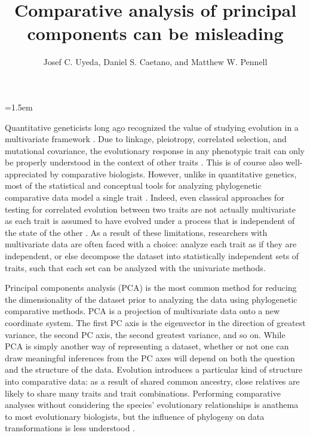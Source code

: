 \documentclass[a4paper,11pt]{article}
\title{Comparative analysis of principal components can be misleading}
\author{
Josef C. Uyeda, Daniel S. Caetano, and Matthew W. Pennell
}
\date{}
\affiliation{
Department of Biological Sciences \& Institute for Bioinformatics and Evolutionary Studies, University of Idaho, Moscow, ID 83844, U.S.A. 
}
\begin{document}
\mstitlepage
\parindent=1.5em
\addtolength{\parskip}{.3em}
\vfill
 
\finaltrue
\newpage
\singlespacing

\noindent Quantitative geneticists long ago recognized the value of studying evolution in a multivariate framework \citep{Pearson1903}. Due to linkage, pleiotropy, correlated selection, and mutational covariance, the evolutionary response in any phenotypic trait can only be properly understood in the context of other traits \citep{Lande1979, LynchWalsh}. This is of course also well-appreciated by comparative biologists. However, unlike in quantitative genetics, most of the statistical and conceptual tools for analyzing phylogenetic comparative data \citep[reviewed in][]{PennellHarmon} model a single trait \citep[but see,][for exceptions]{RevellHarmon2008, RevellPCCA, Hohenlohe2008, RevellCollar2009, Schmitz2011, Bartoszek2012, Adams2014b,Adams2014}. Indeed, even classical approaches for testing for correlated evolution between two traits \citep[e.g.,][]{Felsenstein1985, Grafen1989} are not actually multivariate as each trait is assumed to have evolved under a process that is independent of the state of the other \citep{HansenOrzack2005}. As a result of these limitations, researchers with multivariate data are often faced with a choice: analyze each trait as if they are independent, or else decompose the dataset into statistically independent sets of traits, such that each set can be analyzed with the univariate methods.

Principal components analysis (PCA) is the most common method for reducing the dimensionality of the dataset prior to analyzing the data using phylogenetic comparative methods. PCA is a projection of multivariate data onto a new coordinate system. The first PC axis is the eigenvector in the direction of greatest variance, the second PC axis, the second greatest variance, and so on. While PCA is simply another way of representing a dataset, whether or not one can draw meaningful inferences from the PC axes will depend on both the question and the structure of the data. Evolution introduces a particular kind of structure into comparative data: as a result of shared common ancestry, close relatives are likely to share many traits and trait combinations. Performing comparative analyses without considering the species' evolutionary relationships is anathema to most evolutionary biologists, but the influence of phylogeny on data transformations is less understood \citep{Revell2008, Polly2013}.
\end{document}
